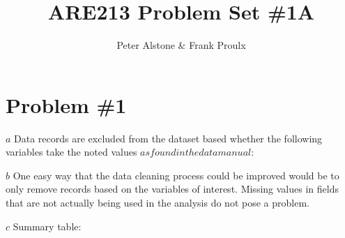 \documentclass[a4paper, 12pt]{article}
\begin{document}
\title{ARE213 Problem Set \#1A}
\author{Peter Alstone \& Frank Proulx}
\maketitle

\section{Problem \#1}
\(a\) Data records are excluded from the dataset based whether the following variables take the noted values \(as found in the data manual\):

\(b\) One easy way that the data cleaning process could be improved would be to only remove records based on the variables of interest. Missing values in fields that are not actually being used in the analysis do not pose a problem.


\(c\) Summary table:
%
\end{document}
